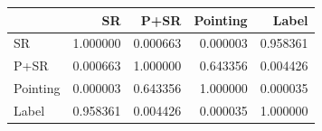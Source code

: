 \begin{tabular}{lrrrr}
\toprule
 & SR & P+SR & Pointing & Label \\
\midrule
SR & 1.000000 & 0.000663 & 0.000003 & 0.958361 \\
P+SR & 0.000663 & 1.000000 & 0.643356 & 0.004426 \\
Pointing & 0.000003 & 0.643356 & 1.000000 & 0.000035 \\
Label & 0.958361 & 0.004426 & 0.000035 & 1.000000 \\
\bottomrule
\end{tabular}
